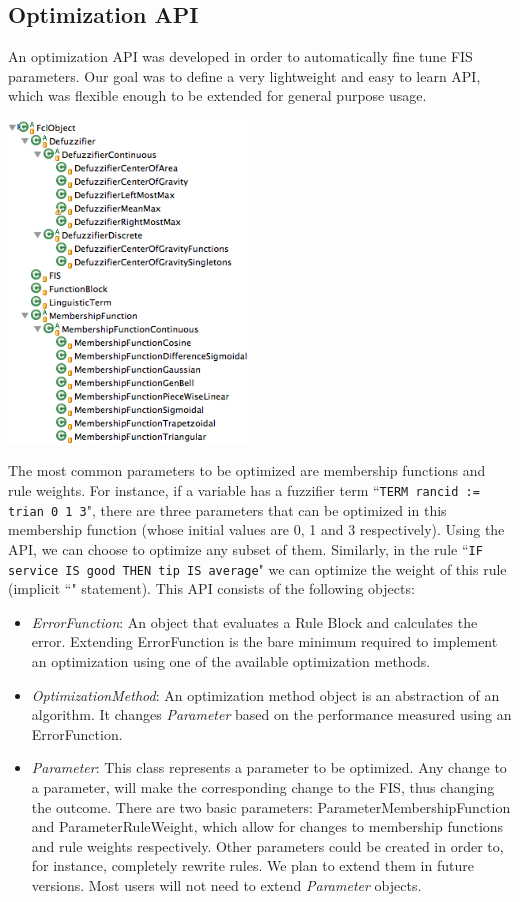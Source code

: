 \documentclass[11pt,twoside]{article}
\begin{document}
\begin{multicols}{2}
\subsection{Optimization API \label{sec:optim}}


An optimization API was developed in order to automatically fine tune FIS parameters. Our goal was to define a very lightweight and easy to learn API, which was flexible enough to be extended for general purpose usage.

\centerline{\includegraphics[width=2.5in]{./figs/jFuzzy_object_tree_2.png}}
\label{f:tree}

The most common parameters to be optimized are membership functions and rule weights. For instance, if a variable has a fuzzifier term ``\texttt{TERM rancid := trian 0 1 3}", there are three parameters that can be optimized in this membership function (whose initial values are 0, 1 and 3 respectively).  Using the API, we can choose to optimize any subset of them. Similarly, in the rule ``\texttt{IF service IS good THEN tip IS average}" we can optimize the weight of this rule (implicit ``" statement). This API consists of the following objects:
\begin{itemize}
	\item \textit{ErrorFunction}: An object that evaluates a Rule Block and calculates the error. Extending ErrorFunction is the bare minimum required to implement an optimization using one of the available optimization methods.
	\item \textit{OptimizationMethod}: An optimization method object is an abstraction of an algorithm. It changes \textit{Parameter} based on the performance measured using an ErrorFunction.
	\item \textit{Parameter}: This class represents a parameter to be optimized. Any change to a parameter, will make the corresponding change to the FIS, thus changing the outcome. There are two basic parameters: ParameterMembershipFunction and ParameterRuleWeight, which allow for changes to membership functions and rule weights respectively. Other parameters could be created in order to, for instance, completely rewrite rules. We plan to extend them in future versions. Most users will not need to extend \textit{Parameter} objects.
\end{itemize}


\end{multicols}
\end{document}
